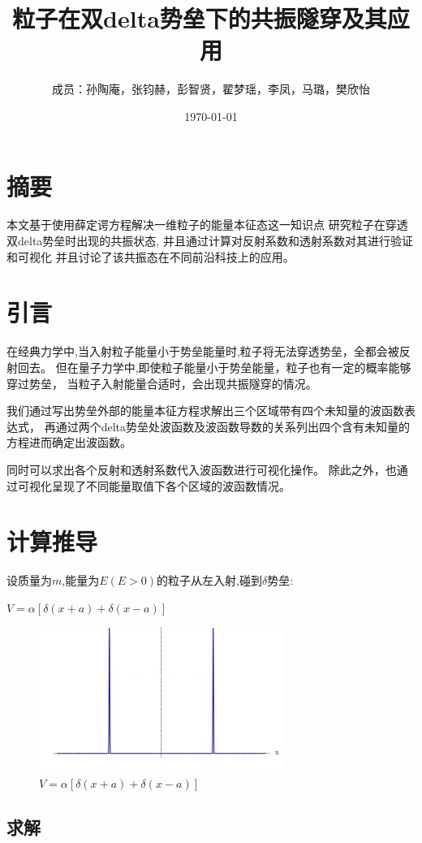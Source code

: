 \documentclass[12pt, a4paper, oneside]{ctexart}
\title{粒子在双delta势垒下的共振隧穿及其应用}
\date{\today}
\author{成员：孙陶庵，张钧赫，彭智贤，翟梦瑶，李凤，马璐，樊欣怡}
\begin{document}
\begin{spacing}{2.0}
\maketitle
\section{摘要}
本文基于使用薛定谔方程解决一维粒子的能量本征态这一知识点
研究粒子在穿透双delta势垒时出现的共振状态,
并且通过计算对反射系数和透射系数对其进行验证和可视化
并且讨论了该共振态在不同前沿科技上的应用。
\section{引言}
在经典力学中,当入射粒子能量小于势垒能量时,粒子将无法穿透势垒，全都会被反射回去。
但在量子力学中,即使粒子能量小于势垒能量，粒子也有一定的概率能够穿过势垒，
当粒子入射能量合适时，会出现共振隧穿的情况。\par
我们通过写出势垒外部的能量本征方程求解出三个区域带有四个未知量的波函数表达式，
再通过两个delta势垒处波函数及波函数导数的关系列出四个含有未知量的方程进而确定出波函数。\par
同时可以求出各个反射和透射系数代入波函数进行可视化操作。
除此之外，也通过可视化呈现了不同能量取值下各个区域的波函数情况。
\section{计算推导}
设质量为$m$,能量为$E(E> 0)$的粒子从左入射,碰到$\delta$势垒:\\
\begin{center}
  $V=\alpha[\delta(x+a)+\delta(x-a)]$
\end{center}
\begin{figure}[htbp]
    \centering
    \includegraphics[width=8cm]{delta.jpg}
    \caption{$V=\alpha[\delta(x+a)+\delta(x-a)]$}
\end{figure}
\subsection{求解}


\end{spacing}
\end{document}
